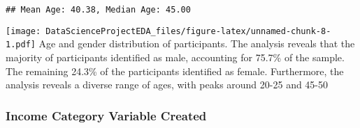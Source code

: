 \documentclass[
]{article}
\newenvironment{Shaded}{\begin{snugshade}}{\end{snugshade}}
\newcommand{\AttributeTok}[1]{\textcolor[rgb]{0.13,0.29,0.53}{#1}}
\newcommand{\CommentTok}[1]{\textcolor[rgb]{0.56,0.35,0.01}{\textit{#1}}}
\newcommand{\DecValTok}[1]{\textcolor[rgb]{0.00,0.00,0.81}{#1}}
\newcommand{\FunctionTok}[1]{\textcolor[rgb]{0.13,0.29,0.53}{\textbf{#1}}}
\newcommand{\NormalTok}[1]{#1}
\newcommand{\OtherTok}[1]{\textcolor[rgb]{0.56,0.35,0.01}{#1}}
\newcommand{\SpecialCharTok}[1]{\textcolor[rgb]{0.81,0.36,0.00}{\textbf{#1}}}
\newcommand{\StringTok}[1]{\textcolor[rgb]{0.31,0.60,0.02}{#1}}
\begin{document}
\begin{verbatim}
## Mean Age: 40.38, Median Age: 45.00
\end{verbatim}

\begin{Shaded}
\end{Shaded}

\texttt{[image: DataScienceProjectEDA\_files/figure-latex/unnamed-chunk-8-1.pdf]}
Age and gender distribution of participants. The analysis reveals that
the majority of participants identified as male, accounting for 75.7\%
of the sample. The remaining 24.3\% of the participants identified as
female. Furthermore, the analysis reveals a diverse range of ages, with
peaks around 20-25 and 45-50

\hypertarget{income-category-variable-created}{%
\subsubsection{Income Category Variable
Created}\label{income-category-variable-created}}
\end{document}
